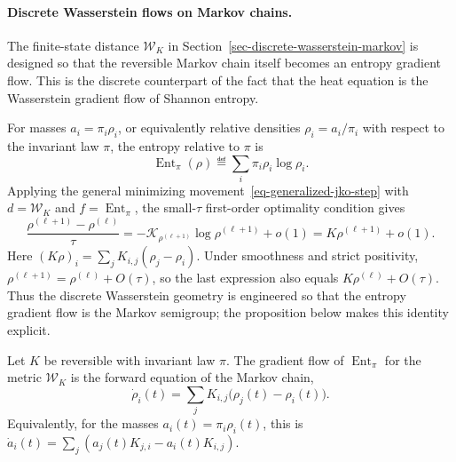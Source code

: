 \paragraph{Discrete Wasserstein flows on Markov chains.}
The finite-state distance \(\mathcal W_K\) in Section~\ref{sec-discrete-wasserstein-markov} is designed so that the reversible Markov chain itself becomes an entropy gradient flow. This is the discrete counterpart of the fact that the heat equation is the Wasserstein gradient flow of Shannon entropy.

For masses \(a_i=\pi_i\rho_i\), or equivalently relative densities \(\rho_i=a_i/\pi_i\) with respect to the invariant law \(\pi\), the entropy relative to \(\pi\) is
\[
\operatorname{Ent}_\pi(\rho)\eqdef\sum_i\pi_i\rho_i\log\rho_i.
\]
Applying the general minimizing movement~\eqref{eq-generalized-jko-step} with \(d=\mathcal W_K\) and \(f=\operatorname{Ent}_\pi\), the small-\(\tau\) first-order optimality condition gives
\[
\frac{\rho^{(\ell+1)}-\rho^{(\ell)}}{\tau}
=-\mathcal K_{\rho^{(\ell+1)}}\log\rho^{(\ell+1)}+o(1)
=K\rho^{(\ell+1)}+o(1).
\]
Here \((K\rho)_i=\sum_jK_{i,j}(\rho_j-\rho_i)\). Under smoothness and strict positivity, $\rho^{(\ell+1)}=\rho^{(\ell)}+O(\tau)$, so the last expression also equals $K\rho^{(\ell)}+O(\tau)$. Thus the discrete Wasserstein geometry is engineered so that the entropy gradient flow is the Markov semigroup; the proposition below makes this identity explicit.

\begin{prop}
\label{prop-discrete-markov-entropy-gradient}
Let \(K\) be reversible with invariant law \(\pi\). The gradient flow of \(\operatorname{Ent}_\pi\) for the metric \(\mathcal W_K\) is the forward equation of the Markov chain,
\begin{equation}
\label{eq-discrete-markov-gradient-flow}
\dot\rho_i(t)=\sum_jK_{i,j}\bigl(\rho_j(t)-\rho_i(t)\bigr).
\end{equation}
Equivalently, for the masses \(a_i(t)=\pi_i\rho_i(t)\), this is \(\dot a_i(t)=\sum_j(a_j(t)K_{j,i}-a_i(t)K_{i,j})\).
\end{prop}

